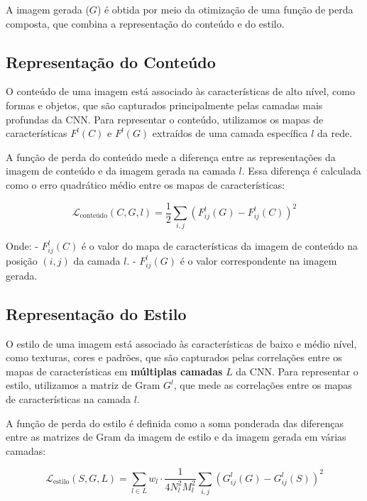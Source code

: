 \documentclass{article}
\begin{document}
A imagem gerada ($G$) é obtida por meio da otimização de uma função de perda composta, que combina a representação do conteúdo e do estilo.

\subsection{Representação do Conteúdo}

O conteúdo de uma imagem está associado às características de alto nível, como formas e objetos, que são capturados principalmente pelas camadas mais profundas da CNN. Para representar o conteúdo, utilizamos os mapas de características $F^l(C)$ e $F^l(G)$ extraídos de uma camada específica $l$ da rede.

A função de perda do conteúdo mede a diferença entre as representações da imagem de conteúdo e da imagem gerada na camada $l$. Essa diferença é calculada como o erro quadrático médio entre os mapas de características:

\begin{equation}
    \mathcal{L}_{\text{conteúdo}} (C, G, l) = \frac{1}{2} \sum_{i,j} \left(F_{ij}^l(G) - F_{ij}^l(C)\right)^2
\end{equation}

Onde:
- $F_{ij}^l(C)$ é o valor do mapa de características da imagem de conteúdo na posição $(i,j)$ da camada $l$.
- $F_{ij}^l(G)$ é o valor correspondente na imagem gerada.

\subsection{Representação do Estilo}

O estilo de uma imagem está associado às características de baixo e médio nível, como texturas, cores e padrões, que são capturados pelas correlações entre os mapas de características em \textbf{múltiplas camadas} $L$ da CNN. Para representar o estilo, utilizamos a matriz de Gram $G^l$, que mede as correlações entre os mapas de características na camada $l$.

A função de perda do estilo é definida como a soma ponderada das diferenças entre as matrizes de Gram da imagem de estilo e da imagem gerada em várias camadas:

\begin{equation}
    \mathcal{L}_{\text{estilo}} (S, G, L) = \sum_{l \in L} w_l \cdot \frac{1}{4N_l^2 M_l^2} \sum_{i,j} \left(G^l_{ij}(G) - G^l_{ij}(S)\right)^2
\end{equation}
\end{document}

